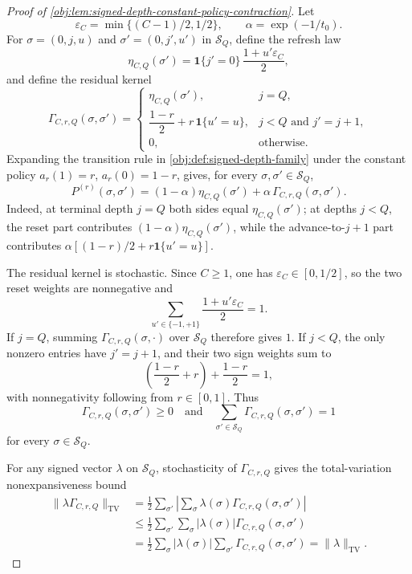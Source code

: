 \begin{proof}[Proof of \cref{obj:lem:signed-depth-constant-policy-contraction}]
Let
\[
\varepsilon_C=\min\{(C-1)/2,1/2\},\qquad
\alpha=\exp(-1/t_0).
\]
For \(\sigma=(0,j,u)\) and \(\sigma'=(0,j',u')\) in \(\mathcal S_Q\), define the refresh law
\[
\eta_{C,Q}(\sigma')
=
\mathbf 1\{j'=0\}\,\frac{1+u'\varepsilon_C}{2},
\]
and define the residual kernel
\[
\Gamma_{C,r,Q}(\sigma,\sigma')
=
\begin{cases}
\eta_{C,Q}(\sigma'), & j=Q,\\[2mm]
\dfrac{1-r}{2}+r\,\mathbf 1\{u'=u\}, & j<Q \text{ and } j'=j+1,\\[2mm]
0, & \text{otherwise.}
\end{cases}
\]
Expanding the transition rule in \cref{obj:def:signed-depth-family} under the constant policy \(a_r(1)=r\), \(a_r(0)=1-r\), gives, for every \(\sigma,\sigma'\in\mathcal S_Q\),
\[
P^{(r)}(\sigma,\sigma')
=
(1-\alpha)\eta_{C,Q}(\sigma')
+
\alpha\,\Gamma_{C,r,Q}(\sigma,\sigma').
\]
Indeed, at terminal depth \(j=Q\) both sides equal \(\eta_{C,Q}(\sigma')\); at depths \(j<Q\), the reset part contributes \((1-\alpha)\eta_{C,Q}(\sigma')\), while the advance-to-\(j+1\) part contributes \(\alpha[(1-r)/2+r\mathbf 1\{u'=u\}]\). %

The residual kernel is stochastic. Since \(C\ge1\), one has \(\varepsilon_C\in[0,1/2]\), so the two reset weights are nonnegative and
\[
\sum_{u'\in\{-1,+1\}}\frac{1+u'\varepsilon_C}{2}=1.
\]
If \(j=Q\), summing \(\Gamma_{C,r,Q}(\sigma,\cdot)\) over \(\mathcal S_Q\) therefore gives \(1\). If \(j<Q\), the only nonzero entries have \(j'=j+1\), and their two sign weights sum to
\[
\left(\frac{1-r}{2}+r\right)+\frac{1-r}{2}=1,
\]
with nonnegativity following from \(r\in[0,1]\). Thus
\[
\Gamma_{C,r,Q}(\sigma,\sigma')\ge0
\quad\text{and}\quad
\sum_{\sigma'\in\mathcal S_Q}\Gamma_{C,r,Q}(\sigma,\sigma')=1
\]
for every \(\sigma\in\mathcal S_Q\). %

For any signed vector \(\lambda\) on \(\mathcal S_Q\), stochasticity of \(\Gamma_{C,r,Q}\) gives the total-variation nonexpansiveness bound
\[
\begin{aligned}
\|\lambda\Gamma_{C,r,Q}\|_{\mathrm{TV}}
&=
\frac12\sum_{\sigma'}\left|
\sum_{\sigma}\lambda(\sigma)\Gamma_{C,r,Q}(\sigma,\sigma')
\right| \\
&\le
\frac12\sum_{\sigma'}\sum_{\sigma}
|\lambda(\sigma)|\Gamma_{C,r,Q}(\sigma,\sigma') \\
&=
\frac12\sum_{\sigma}|\lambda(\sigma)|
\sum_{\sigma'}\Gamma_{C,r,Q}(\sigma,\sigma')
=
\|\lambda\|_{\mathrm{TV}} .
\end{aligned}
\]


\end{proof}
